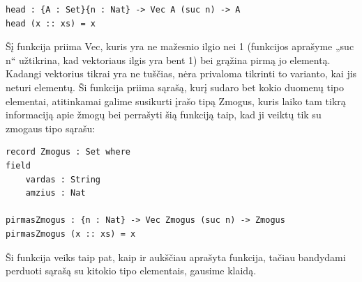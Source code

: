 \documentclass{VUMIFPSbakalaurinis}
\begin{document}
\begin{lstlisting}
head : {A : Set}{n : Nat} -> Vec A (suc n) -> A
head (x :: xs) = x
\end{lstlisting}
Šį funkcija priima Vec, kuris yra ne mažesnio ilgio nei 1 (funkcijos aprašyme „suc n“ užtikrina, kad vektoriaus ilgis yra bent 1) bei grąžina pirmą jo elementą. Kadangi vektorius tikrai yra ne tuščias, nėra privaloma tikrinti to varianto, kai jis neturi elementų. Ši funkcija priima sąrašą, kurį sudaro bet kokio duomenų tipo elementai, atitinkamai galime susikurti įrašo tipą Zmogus, kuris laiko tam tikrą informaciją apie žmogų bei perrašyti šią funkciją taip, kad ji veiktų tik su zmogaus tipo sąrašu:
\begin{lstlisting}
record Zmogus : Set where
field
	vardas : String
	amzius : Nat

pirmasZmogus : {n : Nat} -> Vec Zmogus (suc n) -> Zmogus
pirmasZmogus (x :: xs) = x	
	\end{lstlisting}
Ši funkcija veiks taip pat, kaip ir aukščiau aprašyta funkcija, tačiau bandydami perduoti sąrašą su kitokio tipo elementais, gausime klaidą.	
\end{document}
